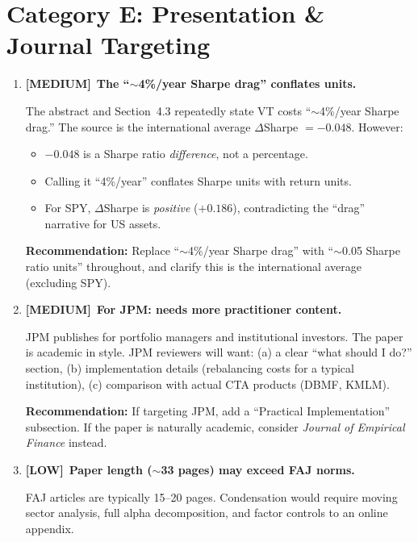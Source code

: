 \documentclass[12pt,a4paper]{article}
\newcommand{\MEDIUM}{\textcolor{medsev}{\textbf{[MEDIUM]}}}
\newcommand{\LOW}{\textcolor{lowsev}{\textbf{[LOW]}}}
\begin{document}
\section{Category E: Presentation \& Journal Targeting}
\label{sec:presentation}

\begin{enumerate}[label=\textbf{E.\arabic*}]

\item \MEDIUM\ \textbf{The ``$\sim$4\%/year Sharpe drag'' conflates units.}

The abstract and Section~4.3 repeatedly state VT costs ``$\sim$4\%/year Sharpe drag.'' The source is the international average $\Delta$Sharpe $= -0.048$. However:
\begin{itemize}
    \item $-0.048$ is a Sharpe ratio \textit{difference}, not a percentage.
    \item Calling it ``4\%/year'' conflates Sharpe units with return units.
    \item For SPY, $\Delta$Sharpe is \textit{positive} ($+0.186$), contradicting the ``drag'' narrative for US assets.
\end{itemize}

\textbf{Recommendation:} Replace ``$\sim$4\%/year Sharpe drag'' with ``$\sim$0.05 Sharpe ratio units'' throughout, and clarify this is the international average (excluding SPY).


\item \MEDIUM\ \textbf{For JPM: needs more practitioner content.}

JPM publishes for portfolio managers and institutional investors. The paper is academic in style. JPM reviewers will want: (a) a clear ``what should I do?'' section, (b) implementation details (rebalancing costs for a typical institution), (c) comparison with actual CTA products (DBMF, KMLM).

\textbf{Recommendation:} If targeting JPM, add a ``Practical Implementation'' subsection. If the paper is naturally academic, consider \textit{Journal of Empirical Finance} instead.


\item \LOW\ \textbf{Paper length ($\sim$33 pages) may exceed FAJ norms.}

FAJ articles are typically 15--20 pages. Condensation would require moving sector analysis, full alpha decomposition, and factor controls to an online appendix.



\end{enumerate}
\end{document}
